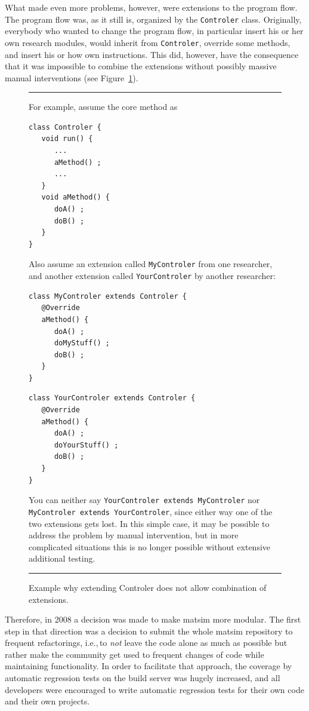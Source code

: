 What made even more problems, however, were extensions to the program flow.  The program flow was, as it still is, organized by the \lstinline$Controler$ class.  Originally, everybody who wanted to change the program flow, in particular insert his or her own research \glspl{module}, would inherit from \lstinline$Controler$, override some methods, and insert his or how own instructions.  This did, however, have the consequence that it was impossible to combine the \glspl{extension} without possibly massive manual interventions (see Figure~\ref{fig:do-not-extend-controler}).

\begin{figure}\footnotesize
\hrule
For example, assume the core method as
\begin{lstlisting}
class Controler {
   void run() {
      ...
      aMethod() ;
      ...
   }
   void aMethod() {
      doA() ;
      doB() ;
   }
}
\end{lstlisting}
Also assume an extension called \protect\lstinline$MyControler$
from one researcher, and another extension called \protect\lstinline$YourControler$ by another researcher:
\begin{lstlisting}
class MyControler extends Controler {
   @Override
   aMethod() {
      doA() ;
      doMyStuff() ;
      doB() ;
   }
}
\end{lstlisting}
\begin{lstlisting}
class YourControler extends Controler {
   @Override
   aMethod() {
      doA() ;
      doYourStuff() ;
      doB() ;
   }
}  
\end{lstlisting}
You can neither say \protect\lstinline$YourControler extends MyControler$ nor \protect\lstinline$MyControler extends YourControler$, since either way one of the two extensions gets lost.  In this simple case, it may be possible to address the problem by manual intervention, but in more complicated situations this is no longer possible without extensive additional testing.
\hrule
\caption{Example why extending Controler does not allow combination of extensions.}
\label{fig:do-not-extend-controler}
\end{figure}

Therefore, in 2008 a decision was made to make \gls{matsim} more modular.  The first step in that direction was a decision to submit the whole \gls{matsim} repository to frequent refactorings, i.e.,\,to \emph{not} leave the code alone as much as possible but rather make the community get used to frequent changes of code while maintaining functionality.  In order to facilitate that approach, the coverage by automatic regression tests on the build server was hugely increased, and all developers were encouraged to write automatic regression tests for their own code and their own projects. 

